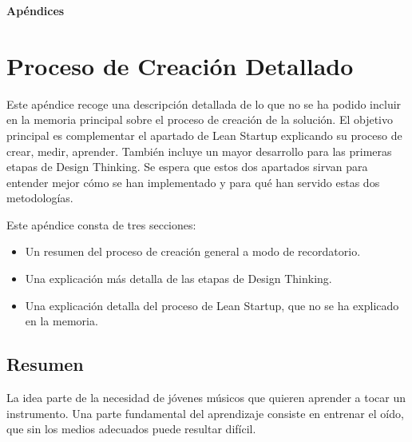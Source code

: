 \documentclass[12pt,twoside,titlepage]{report}
\newcommand\blankpage{%
    \newpage
    \null
    \thispagestyle{empty}%
    \newpage}
\begin{document}
\blankpage




{}
\footnotesize{
%


}
\raggedbottom
\afterpage{\blankpage}
\newpage



\appendix
{}
{}
\mbox{}
\vfill
\begin{center}
\begin{Huge}
\textbf{Apéndices}
\end{Huge}
\end{center}
\vfill
\mbox{}
\thispagestyle{empty}
\newpage
\mbox{}
\thispagestyle{empty}
\newpage

\chapter{Proceso de Creación Detallado}
\label{sec:apendices}

Este apéndice recoge una descripción detallada de lo que no se ha podido incluir en la memoria principal sobre el proceso de creación de la solución. El objetivo principal es complementar el apartado de Lean Startup explicando su proceso de crear, medir, aprender. También incluye un mayor desarrollo para las primeras etapas de Design Thinking. Se espera que estos dos apartados sirvan para entender mejor cómo se han implementado y para qué han servido estas dos metodologías. 

Este apéndice consta de tres secciones:

\begin{itemize}
    \item Un resumen del proceso de creación general a modo de recordatorio.
    \item Una explicación más detalla de las etapas de Design Thinking.
    \item Una explicación detalla del proceso de Lean Startup, que no se ha explicado en la memoria.
\end{itemize}

\section{Resumen}
La idea parte de la necesidad de jóvenes músicos que quieren aprender a tocar un instrumento. Una parte fundamental del aprendizaje consiste en entrenar el oído, que sin los medios adecuados puede resultar difícil.
\end{document}

